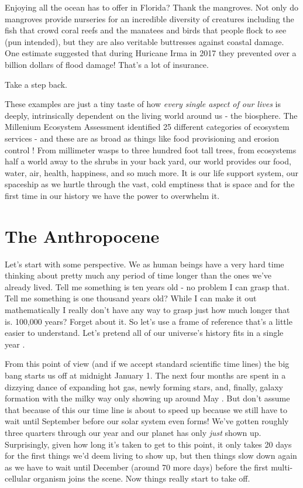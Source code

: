 \documentclass[11pt,a5paper]{book}
\begin{document}
Enjoying all the ocean has to offer in Florida? Thank the mangroves. Not only do mangroves provide nurseries for an incredible diversity of creatures including the fish that crowd coral reefs and the manatees and birds that people flock to see (pun intended), but they are also veritable buttresses against coastal damage. One estimate suggested that during Huricane Irma in 2017 they prevented over a billion dollars of flood damage! That's a lot of insurance. 
\newline

Take a step back. 
\newline

These examples are just a tiny taste of how \textit{every single aspect of our lives} is deeply, intrinsically dependent on the living world around us - the biosphere. The Millenium Ecosystem Assessment identified 25 different categories of ecosystem services - and these are as broad as things like food provisioning and erosion control \cite{mas}! From millimeter wasps to three hundred foot tall trees, from ecosystems half a world away to the shrubs in your back yard, our world provides our food, water, air, health, happiness, and so much more. It is our life support system, our spaceship as we hurtle through the vast, cold emptiness that is space and for the first time in our history we have the power to overwhelm it. 

\section{The Anthropocene}
Let's start with some perspective. We as human beings have a very hard time thinking about pretty much any period of time longer than the ones we've already lived. Tell me something is ten years old - no problem I can grasp that. Tell me something is one thousand years old? While I can make it out mathematically I really don't have any way to grasp just how much longer that is. 100,000 years? Forget about it. So let's use a frame of reference that's a little easier to understand. Let's pretend all of our universe's history fits in a single year \cite{csagan}. 

From this point of view (and if we accept standard scientific time lines) the big bang starts us off at midnight January 1. The next four months are spent in a dizzying dance of expanding hot gas, newly forming stars, and, finally, galaxy formation with the milky way only showing up around May \cite{eellis}. But don't assume that because of this our time line is about to speed up because we still have to wait until September before our solar system even forms! We've gotten roughly three quarters through our year and our planet has only \textit{just} shown up. Surprisingly, given how long it's taken to get to this point, it only takes 20 days for the first things we'd deem living to show up, but then things slow down again as we have to wait until December (around 70 more days) before the first multi-cellular organism joins the scene. Now things really start to take off. 
\end{document}
